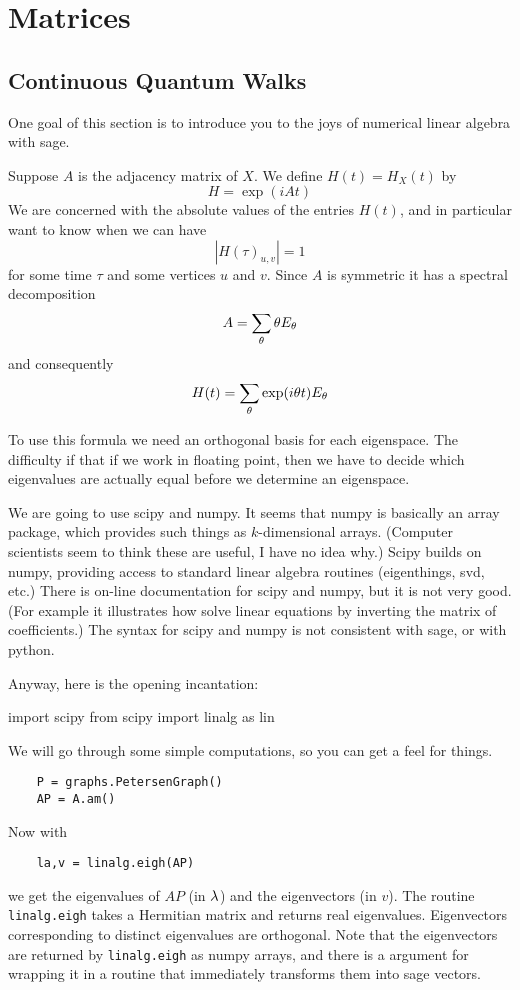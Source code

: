 
\chapter{Matrices}

\section{Continuous Quantum Walks}

One goal of this section is to introduce you to the joys of numerical linear
algebra with sage.

Suppose $A$ is the adjacency matrix of $X$. We define $H(t)=H_X(t)$ by
\[
    H =\exp(iAt)
\]
We are concerned with the absolute values of the entries $H(t)$, and in particular
want to know when we can have
\[
    |H(\tau)_{u,v}| =1
\]
for some time $\tau$ and some vertices $u$ and $v$. Since $A$ is symmetric 
it has a spectral decomposition
\[
    A =\sum_\theta \theta E_\theta
\]
and consequently
\[
    H(t) = \sum_\theta \exp(i\theta t)E_\theta
\]

To use this formula we need an orthogonal basis for each eigenspace.
The difficulty if that if we work in floating point, then we have
to decide which eigenvalues are actually equal before we determine
an eigenspace.

We are going to use scipy and numpy. 
It seems that numpy is basically an array package, which 
provides such things as $k$-dimensional arrays. (Computer scientists seem
to think these are useful, I have no idea why.) Scipy builds on numpy, providing
access to standard linear algebra routines (eigenthings, svd, etc.)
There is on-line documentation for scipy and numpy, but it is not very good.
(For example it illustrates how solve linear equations by inverting the matrix 
of coefficients.) The syntax for scipy and numpy is not consistent with sage, or 
with python. 

Anyway, here is the opening incantation:
\begin{sageblock}
import scipy
from scipy import linalg as lin
\end{sageblock}

We will go through some simple computations, so you can get a feel for things.
\begin{verbatim}
    P = graphs.PetersenGraph()
    AP = A.am()
\end{verbatim}

Now with
\begin{verbatim}
	la,v = linalg.eigh(AP)
\end{verbatim}
we get the eigenvalues of $AP$ (in $\lambda$) and the eigenvectors (in \(v\)).
The routine \verb|linalg.eigh| takes a Hermitian matrix and returns real eigenvalues.
Eigenvectors corresponding to distinct eigenvalues are orthogonal. Note that the
eigenvectors are returned by
\verb|linalg.eigh| as numpy arrays, and there is a argument for
wrapping it in a routine that immediately transforms them into sage vectors.

